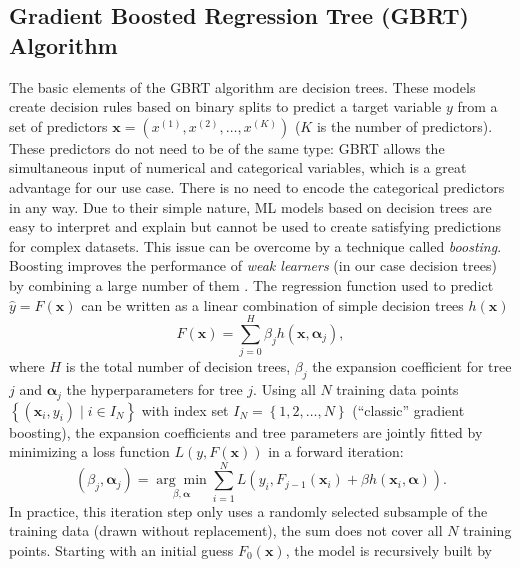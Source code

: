 \subsection{Gradient Boosted Regression Tree (\acs{GBRT}) Algorithm}
\label{subsec:app:b:gbrt}

The basic elements of the \ac{GBRT} algorithm are decision trees. These models
create decision rules based on binary splits to predict a target variable $y$
from a set of predictors $\bm{x} = \left( x^{(1)}, x^{(2)}, \ldots, x^{(K)}
\right)$ ($K$ is the number of predictors). These predictors do not need to be
of the same type: \ac{GBRT} allows the simultaneous input of numerical and
categorical variables, which is a great advantage for our use case. There is no
need to encode the categorical predictors in any way. Due to their simple
nature, \acf{ML} models based on decision trees are easy to interpret and
explain but cannot be used to create satisfying predictions for complex
datasets. This issue can be overcome by a technique called \emph{boosting}.
Boosting improves the performance of \emph{weak learners} (in our case decision
trees) by combining a large number of them  \autocite{Freund1996}. The
regression function used to predict $\hat{y} = F(\bm{x})$ can be written as a
linear combination of simple decision trees $h(\bm{x})$
\begin{equation}
  F(\bm{x}) = \sum_{j=0}^{H} \beta_j h(\bm{x}, \bm{\alpha}_j),
  \label{eq:app:b:f_x_sum}
\end{equation}
where $H$ is the total number of decision trees, $\beta_j$ the expansion
coefficient for tree $j$ and $\bm{\alpha}_j$ the hyperparameters for tree $j$.
Using all $N$ training data points $\left\{ \left( \bm{x}_i, y_i \right) \mid i
\in I_N \right\}$ with index set $I_N = \left\{ 1, 2, \ldots, N \right\}$
(\enquote{classic} gradient boosting), the expansion coefficients and tree
parameters are jointly fitted by minimizing a loss function $L \left( y,
F(\bm{x}) \right)$ in a forward iteration:
\begin{equation}
  \left( \beta_j, \bm{\alpha}_j \right) = \underset{\beta,
    \bm{\alpha}}{\arg\min} \sum_{i=1}^{N} L \left( y_i, F_{j-1}(\bm{x}_i) +
  \beta h(\bm{x}_i, \bm{\alpha}) \right).
  \label{eq:app:b:beta_alpha}
\end{equation}
In practice, this iteration step only uses a randomly selected subsample of the
training data (drawn without replacement), \ie{} the sum does not cover all $N$
training points. Starting with an initial guess $F_0(\bm{x})$, the model is
recursively built by
